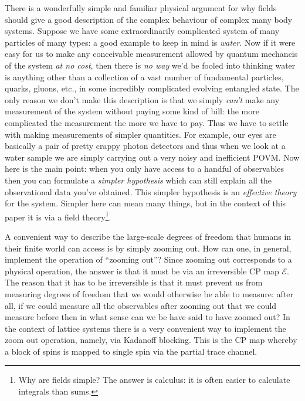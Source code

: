 \documentclass[11pt]{amsart}
\theoremstyle{plain}%
\theoremstyle{definition}
\theoremstyle{remark}
\begin{document}
There is a wonderfully simple and familiar physical argument for why fields should give a good description of the complex behaviour of complex many body systems. Suppose we have some extraordinarily complicated system of many particles of many types: a good example to keep in mind is \emph{water}. Now if it were easy for us to make any conceivable measurement allowed by quantum mechancis of the system \emph{at no cost}, then there is \emph{no way} we'd be fooled into thinking water is anything other than a collection of a vast number of fundamental particles, quarks, gluons, etc., in some incredibly complicated evolving entangled state. The only reason we don't make this description is that we simply \emph{can't} make any measurement of the system without paying some kind of bill: the more complicated the measurement the more we have to pay. Thus we have to settle with making measurements of simpler quantities. For example, our eyes are basically a pair of pretty crappy photon detectors and thus when we look at a water sample we are simply carrying out a very noisy and inefficient POVM. Now here is the main point: when you only have access to a handful of observables then you can formulate a \emph{simpler hypothesis} which can still explain all the observational data you've obtained. This simpler hypothesis is an \emph{effective theory} for the system. Simpler here can mean many things, but in the context of this paper it is via a field theory\footnote{Why are fields simple? The answer is calculus: it is often easier to calculate integrals than sums.}.

A convenient way to describe the large-scale degrees of freedom that humans in their finite world can access is by simply zooming out. How can one, in general, implement the operation of ``zooming out''? Since zooming out corresponds to a physical operation, the answer is that it must be via an irreversible CP map $\mathcal{E}$. The reason that it has to be irreversible is that it must prevent us from measuring degrees of freedom that we would otherwise be able to measure: after all, if we could measure all the observables after zooming out that we could measure before then in what sense can we be have said to have zoomed out? In the context of lattice systems there is a very convenient way to implement the zoom out operation, namely, via Kadanoff blocking. This is the CP map whereby a block of spins is mapped to single spin via the partial trace channel.
\end{document}
